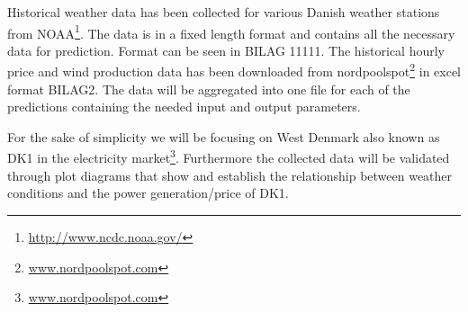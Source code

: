 Historical weather data has been collected for various Danish weather stations from NOAA\footnote{\url{http://www.ncdc.noaa.gov/}}. The data is in a fixed length format and contains all the necessary data for prediction. Format can be seen in BILAG 11111. 
The historical hourly price and wind production data has been downloaded from nordpoolspot\footnote{\url{www.nordpoolspot.com}} in excel format BILAG2.
The data will be aggregated into one file for each of the predictions containing the needed input and output parameters.

For the sake of simplicity we will be focusing on West Denmark also known as DK1 in the electricity market\footnote{\url{www.nordpoolspot.com}}. Furthermore the collected data will be validated through plot diagrams that show and establish the relationship between weather conditions and the power generation/price of DK1.